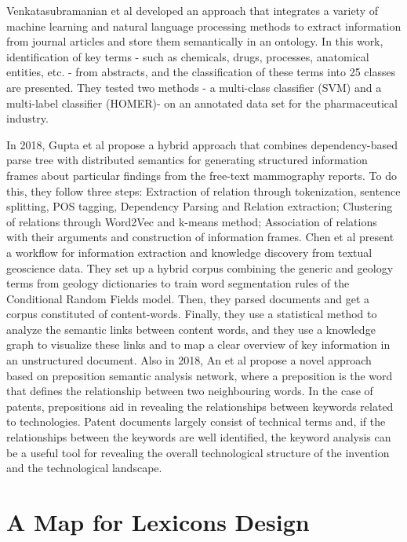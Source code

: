 \documentclass[]{book}
\theoremstyle{definition}
\theoremstyle{definition}
\theoremstyle{definition}
\theoremstyle{remark}
\begin{document}
Venkatasubramanian et al \citep{remolona2017hybrid} developed an
approach that integrates a variety of machine learning and natural
language processing methods to extract information from journal articles
and store them semantically in an ontology. In this work, identification
of key terms - such as chemicals, drugs, processes, anatomical entities,
etc. - from abstracts, and the classification of these terms into 25
classes are presented. They tested two methods - a multi-class
classifier (SVM) and a multi-label classifier (HOMER)- on an annotated
data set for the pharmaceutical industry.

In 2018, Gupta et al \citep{gupta2018automatic} propose a hybrid
approach that combines dependency-based parse tree with distributed
semantics for generating structured information frames about particular
findings from the free-text mammography reports. To do this, they follow
three steps: Extraction of relation through tokenization, sentence
splitting, POS tagging, Dependency Parsing and Relation extraction;
Clustering of relations through Word2Vec and k-means method; Association
of relations with their arguments and construction of information
frames. Chen et al \citep{wang2018information} present a workflow for
information extraction and knowledge discovery from textual geoscience
data. They set up a hybrid corpus combining the generic and geology
terms from geology dictionaries to train word segmentation rules of the
Conditional Random Fields model. Then, they parsed documents and get a
corpus constituted of content-words. Finally, they use a statistical
method to analyze the semantic links between content words, and they use
a knowledge graph to visualize these links and to map a clear overview
of key information in an unstructured document. Also in 2018, An et al
\citep{an2018deriving} propose a novel approach based on preposition
semantic analysis network, where a preposition is the word that defines
the relationship between two neighbouring words. In the case of patents,
prepositions aid in revealing the relationships between keywords related
to technologies. Patent documents largely consist of technical terms
and, if the relationships between the keywords are well identified, the
keyword analysis can be a useful tool for revealing the overall
technological structure of the invention and the technological
landscape.

\section{A Map for Lexicons Design}\label{a-map-for-lexicons-design}
\end{document}
